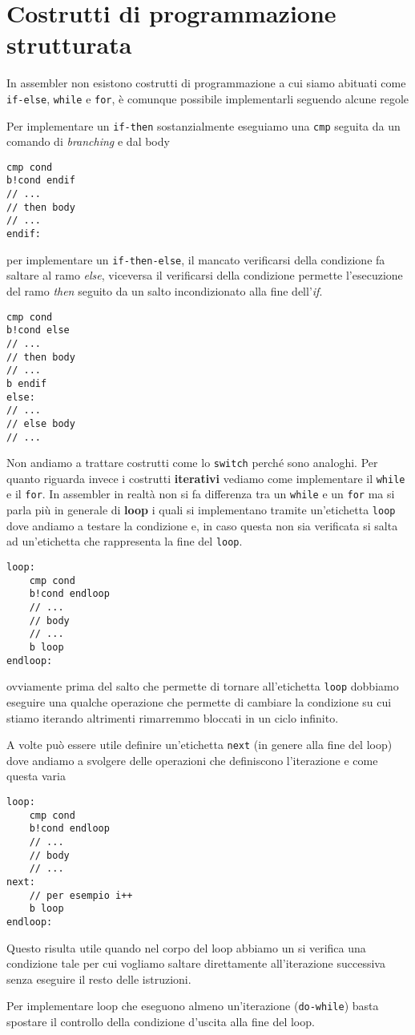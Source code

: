 \section{Costrutti di programmazione strutturata}
In assembler non esistono costrutti di programmazione a cui siamo abituati come \verb|if-else|,
\verb|while| e \verb|for|, è comunque possibile implementarli seguendo alcune regole

Per implementare un \verb|if-then| sostanzialmente eseguiamo una \verb|cmp| seguita da un comando
di \emph{branching} e dal body
\begin{verbatim}
cmp cond
b!cond endif
// ...
// then body
// ...
endif:
\end{verbatim}
per implementare un \verb|if-then-else|, il mancato verificarsi della condizione fa saltare al ramo
\emph{else}, viceversa il verificarsi della condizione permette l'esecuzione del ramo \emph{then}
seguito da un salto incondizionato alla fine dell'\emph{if}.
\begin{verbatim}
cmp cond
b!cond else
// ...
// then body
// ...
b endif
else:
// ...
// else body
// ...
\end{verbatim}
Non andiamo a trattare costrutti come lo \verb|switch| perché sono analoghi. Per quanto riguarda
invece i costrutti \textbf{iterativi} vediamo come implementare il \verb|while| e il \verb|for|.
In assembler in realtà non si fa differenza tra un \verb|while| e un \verb|for| ma si parla più in
generale di \textbf{loop} i quali si implementano tramite un'etichetta \verb|loop| dove andiamo a
testare la condizione e, in caso questa non sia verificata si salta ad un'etichetta che rappresenta
la fine del \verb|loop|.
\begin{verbatim}
loop:
	cmp cond
	b!cond endloop
	// ...
	// body
	// ...
	b loop
endloop:
\end{verbatim}
ovviamente prima del salto che permette di tornare all'etichetta \verb|loop| dobbiamo eseguire una
qualche operazione che permette di cambiare la condizione su cui stiamo iterando altrimenti
rimarremmo bloccati in un ciclo infinito.

A volte può essere utile definire un'etichetta \verb|next| (in genere alla fine del loop) dove
andiamo a svolgere delle operazioni che definiscono l'iterazione e come questa varia
\begin{verbatim}
loop:
	cmp cond
	b!cond endloop
	// ...
	// body
	// ...
next:
	// per esempio i++
	b loop
endloop:
\end{verbatim}
Questo risulta utile quando nel corpo del loop abbiamo un si verifica una condizione tale per cui
vogliamo saltare direttamente all'iterazione successiva senza eseguire il resto delle istruzioni.

Per implementare loop che eseguono almeno un'iterazione (\verb|do-while|) basta spostare il
controllo della condizione d'uscita alla fine del loop.